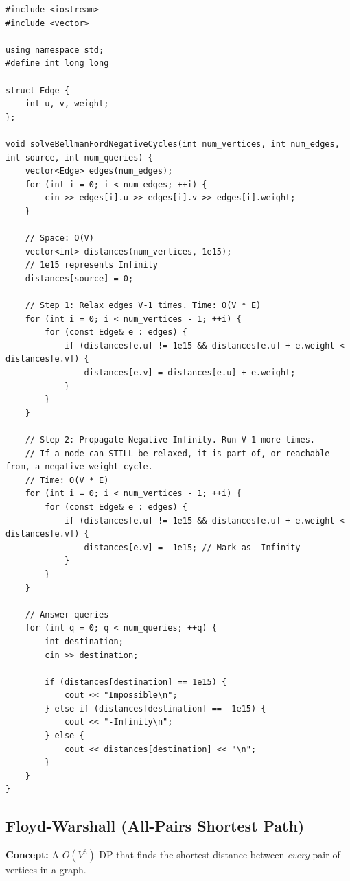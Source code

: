 \begin{lstlisting}
#include <iostream>
#include <vector>

using namespace std;
#define int long long

struct Edge {
    int u, v, weight;
};

void solveBellmanFordNegativeCycles(int num_vertices, int num_edges, int source, int num_queries) {
    vector<Edge> edges(num_edges);
    for (int i = 0; i < num_edges; ++i) {
        cin >> edges[i].u >> edges[i].v >> edges[i].weight;
    }
    
    // Space: O(V)
    vector<int> distances(num_vertices, 1e15);
    // 1e15 represents Infinity
    distances[source] = 0;
    
    // Step 1: Relax edges V-1 times. Time: O(V * E)
    for (int i = 0; i < num_vertices - 1; ++i) {
        for (const Edge& e : edges) {
            if (distances[e.u] != 1e15 && distances[e.u] + e.weight < distances[e.v]) {
                distances[e.v] = distances[e.u] + e.weight;
            }
        }
    }
    
    // Step 2: Propagate Negative Infinity. Run V-1 more times. 
    // If a node can STILL be relaxed, it is part of, or reachable from, a negative weight cycle.
    // Time: O(V * E)
    for (int i = 0; i < num_vertices - 1; ++i) {
        for (const Edge& e : edges) {
            if (distances[e.u] != 1e15 && distances[e.u] + e.weight < distances[e.v]) {
                distances[e.v] = -1e15; // Mark as -Infinity
            }
        }
    }
    
    // Answer queries
    for (int q = 0; q < num_queries; ++q) {
        int destination;
        cin >> destination;
        
        if (distances[destination] == 1e15) {
            cout << "Impossible\n";
        } else if (distances[destination] == -1e15) {
            cout << "-Infinity\n";
        } else {
            cout << distances[destination] << "\n";
        }
    }
}
\end{lstlisting}

\subsection{Floyd-Warshall (All-Pairs Shortest Path)}
\textbf{Concept:} A $O(V^3)$ DP that finds the shortest distance between \textit{every} pair of vertices in a graph.

